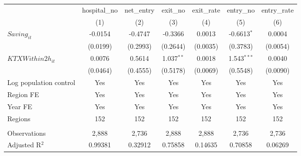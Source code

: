 \begingroup
\centering
\begin{tabular}{lcccccc}
   \toprule
                          & hospital\_no  & net\_entry  & exit\_no     & exit\_rate  & entry\_no     & entry\_rate \\    
                          & (1)           & (2)         & (3)          & (4)         & (5)           & (6)\\  
   \midrule 
   $Saving_{it}$          & -0.0154       & -0.4747     & -0.3366      & 0.0013      & -0.6613$^{*}$ & 0.0004\\   
                          & (0.0199)      & (0.2993)    & (0.2644)     & (0.0035)    & (0.3783)      & (0.0054)\\   
   $KTXWithin2h_{it}$     & 0.0076        & 0.5614      & 1.037$^{**}$ & 0.0018      & 1.543$^{***}$ & 0.0040\\   
                          & (0.0464)      & (0.4555)    & (0.5178)     & (0.0069)    & (0.5548)      & (0.0090)\\   
   Log population control & Yes           & Yes         & Yes          & Yes         & Yes           & Yes\\  
   Region FE              & Yes           & Yes         & Yes          & Yes         & Yes           & Yes\\  
   Year FE                & Yes           & Yes         & Yes          & Yes         & Yes           & Yes\\  
   Regions                & 152           & 152         & 152          & 152         & 152           & 152\\  
    \\
   Observations           & 2,888         & 2,736       & 2,888        & 2,888       & 2,736         & 2,736\\  
   Adjusted R$^2$         & 0.99381       & 0.32912     & 0.75858      & 0.14635     & 0.70858       & 0.06269\\  
   \bottomrule
\end{tabular}
\par\endgroup
